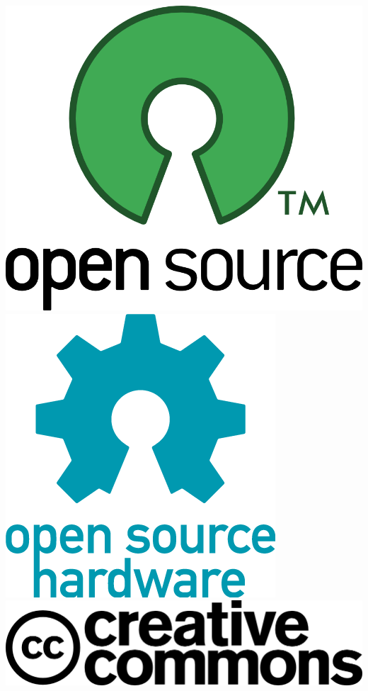 \documentclass{beamer}
\begin{document}
\begin{frame}
\begin{overlayarea}{\textwidth}{\textheight}
\begin{center}
{        \vspace{2em}
        \includegraphics[height=0.15\textheight]{img/opensource}
        \hspace{2em}
        \includegraphics[height=0.15\textheight]{img/opensourcehardware.png}
        \hspace{2em}
        \includegraphics[height=0.15\textheight]{img/cc.png}}

\end{center}
\end{overlayarea}
\end{frame}
\end{document}
